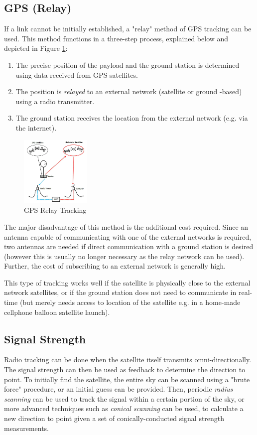 \subsection{GPS (Relay)}
If a link cannot be initially established, a "relay" method of GPS tracking can be used. This method functions in a three-step process, explained below and depicted in Figure \ref{fig:gps_relay}:
\begin{enumerate}
    \item The precise position of the payload and the ground station is determined using data received from GPS satellites.
    \item The position is \textit{relayed} to an external network (satellite or ground -based) using a radio transmitter.
    \item The ground station receives the location from the external network (e.g. via the internet).
\end{enumerate}

\begin{figure}[!htb]
  \centering
  \includegraphics[width=0.3\textwidth]{gps_relay}
  \caption{GPS Relay Tracking \cite{site-highaltitudescienceTrackingWeather}}
  \label{fig:gps_relay}
\end{figure}

The major disadvantage of this method is the additional cost required. Since an antenna capable of communicating with one of the external networks is required, two antennas are needed if direct communication with a ground station is desired (however this is usually no longer necessary as the relay network can be used). Further, the cost of subscribing to an external network is generally high.

This type of tracking works well if the satellite is physically close to the external network satellites, or if the ground station does not need to communicate in real-time (but merely needs access to location of the satellite e.g. in a home-made cellphone balloon satellite launch).

\subsection{Signal Strength}
Radio tracking can be done when the satellite itself transmits omni-directionally. The signal strength can then be used as feedback to determine the direction to point. To initially find the satellite, the entire sky can be scanned using a "brute force" procedure, or an initial guess can be provided. Then, periodic \textit{radius scanning} can be used to track the signal within a certain portion of the sky, or more advanced techniques such as \textit{conical scanning} can be used, to calculate a new direction to point given a set of conically-conducted signal strength measurements.